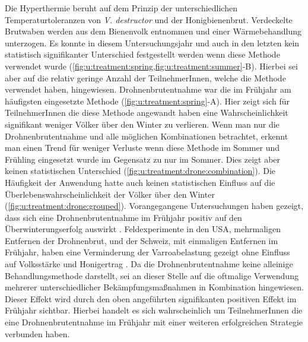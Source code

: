 Die Hyperthermie beruht auf dem Prinzip der unterschiedlichen Temperaturtoleranzen von \textit{V. destructor} und der Honigbienenbrut. Verdeckelte Brutwaben werden aus dem Bienenvolk entnommen und einer Wärmebehandlung unterzogen. Es konnte in diesem Untersuchungsjahr und auch in den letzten kein statistisch signifikanter Unterschied festgestellt werden wenn diese Methode verwendet wurde \citep{crailsheim2018, oberreiter2020} (\cref{fig:u:treatment:spring,fig:u:treatment:summer}-B). Hierbei sei aber auf die relativ geringe Anzahl der TeilnehmerInnen, welche die Methode verwendet haben, hingewiesen.
\newline
Drohnenbrutentnahme war die im Frühjahr am häufigsten eingesetzte Methode (\cref{fig:u:treatment:spring}-A). Hier zeigt sich für TeilnehmerInnen die diese Methode angewandt haben eine Wahrscheinlichkeit signifikant weniger Völker über den Winter zu verlieren. Wenn man nur die Drohnenbrutentnahme und alle möglichen Kombinationen betrachtet, erkennt man einen Trend für weniger Verluste wenn diese Methode im Sommer und Frühling eingesetzt wurde im Gegensatz zu nur im Sommer. Dies zeigt aber keinen statistischen Unterschied (\cref{fig:u:treatment:drone:combination}). Die Häufigkeit der Anwendung hatte auch keinen statistischen Einfluss auf die Überlebenswahrscheinlichkeit der Völker über den Winter (\cref{fig:u:treatment:drone:grouped}). Vorangegangene Untersuchungen haben gezeigt, dass sich eine Drohnenbrutentnahme im Frühjahr positiv auf den Überwinterungserfolg auswirkt \citep{brodschneider2013, oberreiter2020, crailsheim2018}. Feldexperimente in den USA, mehrmaligen Entfernen der Drohnenbrut, und der Schweiz, mit einmaligen Entfernen im Frühjahr, haben eine Verminderung der Varroabelastung gezeigt ohne Einfluss auf Volksstärke und Honigertrag \citep{charriere1998, calderone2005}. Da die Drohnenbrutentnahme keine alleinige Behandlungsmethode darstellt, sei an dieser Stelle auf die oftmalige Verwendung mehrerer unterschiedlicher Bekämpfungsmaßnahmen in Kombination hingewiesen. Dieser Effekt wird durch den oben angeführten signifikanten positiven Effekt im Frühjahr sichtbar. Hierbei handelt es sich wahrscheinlich um TeilnehmerInnen die eine Drohnenbrutentnahme im Frühjahr mit einer weiteren erfolgreichen Strategie verbunden haben. 
\newline
